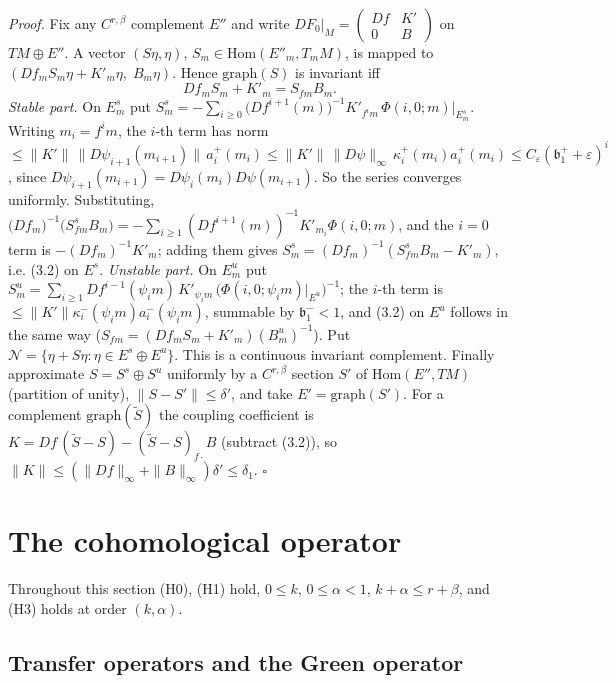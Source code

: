 \documentclass[11pt,a4paper]{article}
\theoremstyle{plain}
\theoremstyle{definition}
\theoremstyle{remark}
\numberwithin{equation}{section}
\numberwithin{figure}{section}
\begin{document}
\textit{Proof.} Fix any $C^{r,\beta}$ complement $E''$ and write $DF_0|_M=\begin{pmatrix}Df&K'\\0&B\end{pmatrix}$ on $TM\oplus E''$. A vector $(S\eta,\eta)$, $S_m\in\mathrm{Hom}(E''_m,T_mM)$, is mapped to $(Df_mS_m\eta+K'_m\eta,\;B_m\eta)$. Hence $\mathrm{graph}(S)$ is invariant iff
\[ Df_mS_m+K'_m=S_{fm}B_m.\tag{3.2} \]
\textit{Stable part.} On $E^s_m$ put $S^s_m=-\sum_{i\ge0}\big(Df^{i+1}(m)\big)^{-1}K'_{f^im}\,\Phi(i,0;m)|_{E^s_m}$. Writing $m_i=f^im$, the $i$-th term has norm $\le\|K'\|\,\|D\psi_{i+1}(m_{i+1})\|\,a^+_i(m_i)\le\|K'\|\,\|D\psi\|_\infty\,\kappa^+_i(m_i)a^+_i(m_i)\le C_\varepsilon(\mathfrak b_1^++\varepsilon)^i$, since $D\psi_{i+1}(m_{i+1})=D\psi_i(m_i)D\psi(m_{i+1})$. So the series converges uniformly. Substituting, $\big(Df^{}_m\big)^{-1}\big(S^s_{fm}B_m\big)=-\sum_{i\ge1}(Df^{i+1}(m))^{-1}K'_{m_i}\Phi(i,0;m)$, and the $i=0$ term is $-(Df_m)^{-1}K'_m$; adding them gives $S^s_m=(Df_m)^{-1}(S^s_{fm}B_m-K'_m)$, i.e. (3.2) on $E^s$.
\textit{Unstable part.} On $E^u_m$ put $S^u_m=\sum_{i\ge1}Df^{i-1}(\psi_im)\,K'_{\psi_im}\,\big(\Phi(i,0;\psi_im)|_{E^u}\big)^{-1}$; the $i$-th term is $\le\|K'\|\kappa^-_i(\psi_im)a^-_i(\psi_im)$, summable by $\mathfrak b^-_1<1$, and (3.2) on $E^u$ follows in the same way ($S_{fm}=(Df_mS_m+K'_m)(B^u_m)^{-1}$). Put $\mathcal N=\{\eta+S\eta:\eta\in E^s\oplus E^u\}$. This is a continuous invariant complement. Finally approximate $S=S^s\oplus S^u$ uniformly by a $C^{r,\beta}$ section $S'$ of $\mathrm{Hom}(E'',TM)$ (partition of unity), $\|S-S'\|\le\delta'$, and take $E'=\mathrm{graph}(S')$. For a complement $\mathrm{graph}(\tilde S)$ the coupling coefficient is $K=Df\,(\tilde S-S)-(\tilde S-S)_{f\cdot}B$ (subtract (3.2)), so $\|K\|\le(\|Df\|_\infty+\|B\|_\infty)\delta'\le\delta_1$. $\square$


\section{The cohomological operator}

Throughout this section (H0), (H1) hold, $0\le k$, $0\le\alpha<1$, $k+\alpha\le r+\beta$, and (H3) holds at order $(k,\alpha)$.

\subsection{Transfer operators and the Green operator}
\end{document}
